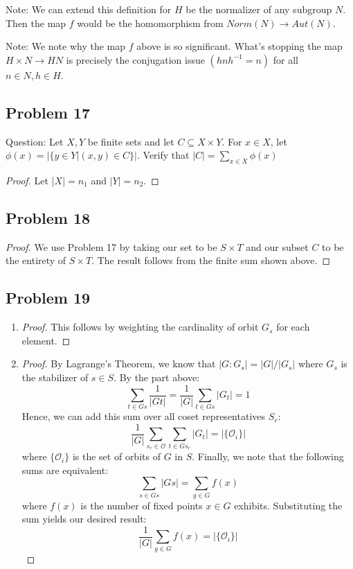 \documentclass[Lang.tex]{subfiles}
\begin{document}
Note: We can extend this definition for $H$ be the normalizer of any subgroup $N$. Then the map $f$ would be the homomorphism from $Norm(N) \rightarrow Aut(N)$. \par

Note: We note why the map $f$ above is so significant. What's stopping the map $H \times N \rightarrow HN$ is precisely the conjugation issue $(hnh^{-1} = n)$ for all $n \in N, h \in H$.

\subsection*{Problem 17}

Question: Let $X,Y$ be finite sets and let $C \subseteq X \times Y$. For $x \in X$, let $\phi(x) = | \{y \in Y \vert (x,y) \in C\}|$. Verify that $|C| = \sum_{x \in X} \phi(x)$

\begin{proof}
	Let $|X| = n_1$ and $|Y| = n_2$. 
\end{proof}

\subsection*{Problem 18}

\begin{proof}
	We use Problem 17 by taking our set to be $S \times T$ and our subset $C$ to be the entirety of $S \times T$. The result follows from the finite sum shown above.
\end{proof}

\subsection*{Problem 19}

\begin{enumerate}
	\item 
	\begin{proof}
		This follows by weighting the cardinality of orbit $G_s$ for each element. 	
	\end{proof}
	\item 
	\begin{proof}
	By Lagrange's Theorem, we know that $|G:G_s| = |G|/|G_s|$ where $G_s$ is the stabilizer of $s \in S$. By the part above: 
	$$\sum_{t \in Gs} \frac{1}{|Gt|} = \frac{1}{|G|}\sum_{t \in Gs} |G_t| = 1 $$
	Hence, we can add this sum over all coset representatives $S_r$:
	$$ \frac{1}{|G|} \sum_{s_r \in \mathcal{O}} \sum_{t \in Gs_r} |G_t| = |\{\mathcal{O}_i\}|$$
	where $\{\mathcal{O}_i\}$ is the set of orbits of $G$ in $S$. Finally, we note that the following sums are equivalent:
	$$\sum_{s \in Gs} |Gs| = \sum_{g \in G} f(x)$$ where $f(x)$ is the number of fixed points $x \in G$ exhibits. Substituting the sum yields our desired result:
	$$ \frac{1}{|G|} \sum_{g \in G} f(x) = |\{\mathcal{O}_i\}|$$	   
	\end{proof}	
\end{enumerate}
\end{document}
